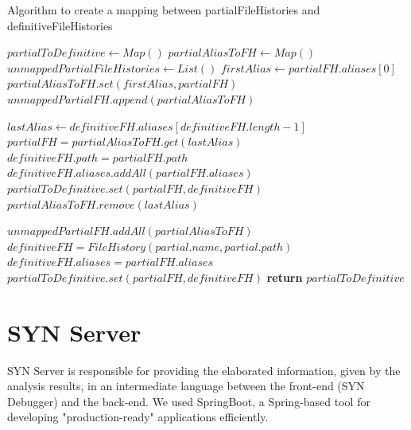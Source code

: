 \begin{algorithm}
    \caption{Algorithm to create a mapping between partialFileHistories and definitiveFileHistories}\label{euclid}
    \begin{algorithmic}[1]
        \State $partialToDefinitive \gets Map()$
        \State $partialAliasToFH \gets Map()$ 
        \State $unmappedPartialFileHistories \gets List()$  
            \State $firstAlias \gets partialFH.aliases[0]$
                \State $partialAliasToFH.set(firstAlias, partialFH)$  
            \Else
                \State $unmappedPartialFH.append(partialAliasToFH)$  
            \EndIf
        \EndFor

         
            \State $lastAlias \gets definitiveFH.aliases[definitiveFH.length - 1]$
                \State $partialFH = partialAliasToFH.get(lastAlias)$
                \State $definitiveFH.path = partialFH.path$
                \State $definitiveFH.aliases.addAll(partialFH.aliases)$
                \State $partialToDefinitive.set(partialFH, definitiveFH)$
                \State $partialAliasToFH.remove(lastAlias)$
            \EndIf
        \EndFor

        \State $unmappedPartialFH.addAll(partialAliasToFH)$ 
            \State $definitiveFH = FileHistory(partial.name, partial.path)$
            \State $definitiveFH.aliases = partialFH.aliases $
            \State $partialToDefinitive.set(partialFH, definitiveFH)$
        \EndFor
        \State \textbf{return} $partialToDefinitive$
    \EndProcedure
    \end{algorithmic}
\end{algorithm}


\section{SYN Server}
SYN Server is responsible for providing the elaborated information, given by the analysis results, in an intermediate language between the 
front-end (SYN Debugger) and the back-end. We used SpringBoot, a Spring-based tool for developing "production-ready" applications efficiently.

